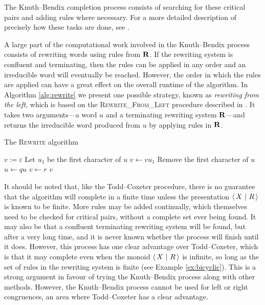 The Knuth--Bendix completion process consists of searching for these critical
pairs and adding rules where necessary.  For a more detailed description of
precisely how these tasks are done, see \cite[\S 2.6]{sims}.

A large part of the computational work involved in the Knuth--Bendix process
consists of rewriting words using rules from $\mathbf{R}$.  If the rewriting system is
confluent and terminating, then the rules can be applied in any order and an
irreducible word will eventually be reached.  However, the order in which the
rules are applied can have a great effect on the overall runtime of the
algorithm.  In Algorithm \ref{alg:rewrite} we present one possible strategy,
known as \textit{rewriting from the left}, which is based on the
\textsc{Rewrite\_From\_Left} procedure described in \cite[\S 2.4]{sims}.  It
takes two arguments---a word $u$ and a terminating rewriting system
$\mathbf{R}$---and returns the irreducible word produced from $u$ by applying rules in
$\mathbf{R}$.

\begin{algorithm}
\caption{The \textsc{Rewrite} algorithm}
\label{alg:rewrite}
\begin{algorithmic}[1]
\State $v := \varepsilon$
  \State Let $u_1$ be the first character of $u$
  \State $v \gets v u_1$
  \State Remove the first character of $u$
      \State $u \gets qu$
      \State $v \gets r$
      \State \Break
    \EndIf
  \EndFor
\EndWhile
\State \Return $v$
\EndProcedure
\end{algorithmic}
\end{algorithm}

It should be noted that, like the
Todd--Coxeter procedure, there is no guarantee that the algorithm will complete
in a finite time unless the presentation $\left\langle\,X ~\middle|~ R\,\right\rangle$ is known to be finite.
More rules may be added continually, which themselves need to
be checked for critical pairs, without a complete set ever being found.  It may
also be that a confluent terminating rewriting system will be found, but after a
very long time, and it is never known whether the process will finish until it
does.  However, this process has one clear advantage over Todd--Coxeter, which is
that it may complete even when the monoid $\left\langle\,X ~\middle|~ R\,\right\rangle$ is infinite, so long as
the set of rules in the rewriting system is finite
(see Example \ref{ex:bicyclic}).  This is a strong argument
in favour of trying the Knuth--Bendix process along with other methods.  However,
the Knuth--Bendix process cannot be used for left or right congruences, an area
where Todd--Coxeter has a clear advantage.

